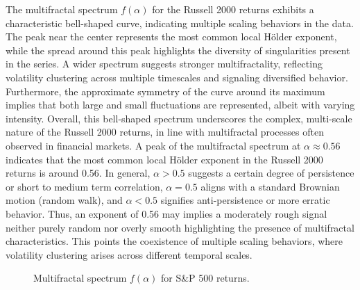 \documentclass[11pt]{extarticle}
\begin{document}
\FloatBarrier

The multifractal spectrum $f(\alpha)$ for the Russell 2000 returns exhibits a characteristic bell-shaped curve,
indicating multiple scaling behaviors in the data. The peak near the center represents the most common local Hölder
exponent, while the spread around this peak highlights the diversity of singularities present in the series. A wider
spectrum suggests stronger multifractality, reflecting volatility clustering across multiple timescales and signaling diversified
behavior. Furthermore,
the approximate symmetry of the curve around its maximum implies that both large and small fluctuations are represented,
albeit with varying intensity. Overall, this bell-shaped spectrum underscores the complex, multi-scale nature of the
Russell 2000 returns, in line with multifractal processes often observed in financial markets.
A peak of the multifractal spectrum at $\alpha \approx 0.56$ indicates that the most common local Hölder exponent
in the Russell 2000 returns is around 0.56. In general, $\alpha > 0.5$ suggests a certain degree of persistence or
short to medium term correlation, $\alpha = 0.5$ aligns with a standard Brownian motion (random walk),
and $\alpha < 0.5$ signifies anti-persistence or more erratic behavior. Thus, an exponent of 0.56 may implies a
moderately rough signal neither purely random nor overly smooth highlighting the presence of multifractal characteristics.
This points the coexistence of multiple scaling behaviors, where volatility clustering arises across different temporal scales.



\begin{figure}[htbp]
    \centering
    \caption{Multifractal spectrum $f(\alpha)$ for S\&P 500 returns.}
\end{figure}
\end{document}
